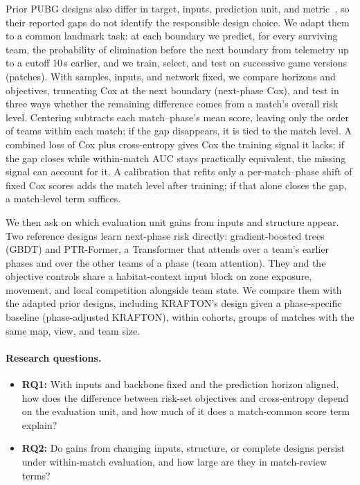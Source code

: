 \documentclass[sigconf,anonymous]{acmart}
\begin{document}
Prior PUBG designs also differ in target, inputs, prediction unit, and metric~\cite{Sagong25a,KRAFTON}, so their reported gaps do not identify the responsible design choice. We adapt them to a common landmark task: at each boundary we predict, for every surviving team, the probability of elimination before the next boundary from telemetry up to a cutoff 10\,s earlier, and we train, select, and test on successive game versions (patches). With samples, inputs, and network fixed, we compare horizons and objectives, truncating Cox at the next boundary (next-phase Cox), and test in three ways whether the remaining difference comes from a match's overall risk level. Centering subtracts each match--phase's mean score, leaving only the order of teams within each match; if the gap disappears, it is tied to the match level. A combined loss of Cox plus cross-entropy gives Cox the training signal it lacks; if the gap closes while within-match AUC stays practically equivalent, the missing signal can account for it. A calibration that refits only a per-match--phase shift of fixed Cox scores adds the match level after training; if that alone closes the gap, a match-level term suffices.

We then ask on which evaluation unit gains from inputs and structure appear. Two reference designs learn next-phase risk directly: gradient-boosted trees (GBDT) and PTR-Former, a Transformer that attends over a team's earlier phases and over the other teams of a phase (team attention). They and the objective controls share a habitat-context input block on zone exposure, movement, and local competition alongside team state. We compare them with the adapted prior designs, including KRAFTON's design given a phase-specific baseline (phase-adjusted KRAFTON), within cohorts, groups of matches with the same map, view, and team size.

\paragraph{Research questions.}
\begin{itemize}
\item \textbf{RQ1:} With inputs and backbone fixed and the prediction horizon aligned, how does the difference between risk-set objectives and cross-entropy depend on the evaluation unit, and how much of it does a match-common score term explain?
\item \textbf{RQ2:} Do gains from changing inputs, structure, or complete designs persist under within-match evaluation, and how large are they in match-review terms?
\end{itemize}
\end{document}
